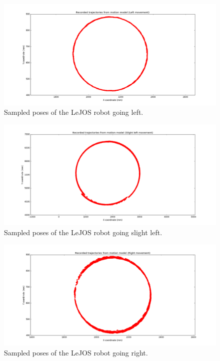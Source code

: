 \documentclass[paper=a4, fontsize=11pt]{scrartcl} %
\begin{document}
    \begin{figure}[h!]
	\begin{center}
		\setlength{\fboxsep}{0.5pt} %
		\setlength{\fboxrule}{0.5pt}
		\includegraphics[width=\linewidth,fbox]{images/raw_left.png}
		\caption{Sampled poses of the LeJOS robot going left.}
	\end{center}
\end{figure}

    \begin{figure}[h!]
	\begin{center}
		\setlength{\fboxsep}{0.5pt} %
		\setlength{\fboxrule}{0.5pt}
		\includegraphics[width=\linewidth,fbox]{images/raw_slightLeft.png}
		\caption{Sampled poses of the LeJOS robot going slight left.}
	\end{center}
	\end{figure}

    \begin{figure}[h!]
	\begin{center}
		\setlength{\fboxsep}{0.5pt} %
		\setlength{\fboxrule}{0.5pt}
		\includegraphics[width=\linewidth,fbox]{images/raw_right.png}
		\caption{Sampled poses of the LeJOS robot going right.}
	\end{center}
	\end{figure}
    
\end{document}
